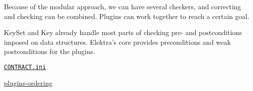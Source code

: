 Because of the modular approach, we can have several checkers, and correcting and checking can be combined. Plugins can work together to reach a certain goal.

{\ttfamily Key\+Set} and {\ttfamily Key} already handle most parts of checking pre-\/ and postconditions imposed on data structures. Elektra’s core provides preconditions and weak postconditions for the plugins.


\begin{DoxyItemize}
\item \href{/home/jenkins/workspace/libelektra-release/doc/CONTRACT.ini}{\tt C\+O\+N\+T\+R\+A\+C\+T.\+ini}
\item \hyperlink{doc_dev_plugins-ordering_md}{plugins-\/ordering} 
\end{DoxyItemize}